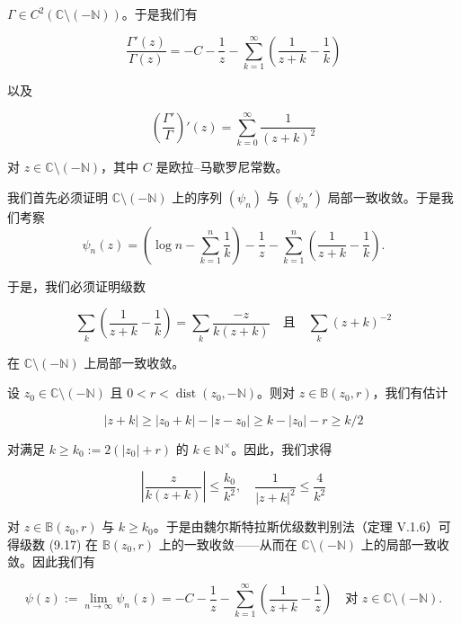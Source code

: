 \begin{proposition}

$ \Gamma \in C^{2}(\mathbb{C}\setminus(-\mathbb{N})) $。于是我们有

\begin{equation}
\frac{\Gamma'(z)}{\Gamma(z)} = -C - \frac{1}{z} - \sum_{k=1}^{\infty} \left( \frac{1}{z+k} - \frac{1}{k} \right)\tag{9.15}
\end{equation}

以及

\begin{equation}
\left( \frac{\Gamma'}{\Gamma} \right)'(z) = \sum_{k=0}^{\infty} \frac{1}{(z+k)^{2}}\tag{9.16}
\end{equation}

对 $ z \in \mathbb{C}\setminus(-\mathbb{N}) $，其中 $ C $ 是欧拉–马歇罗尼常数。

\proofhead
我们首先必须证明 $ \mathbb{C}\setminus(-\mathbb{N}) $ 上的序列 $ (\psi_n) $ 与 $ (\psi_n') $ 局部一致收敛。于是我们考察
\[
\psi_n(z) = \left( \log n - \sum_{k=1}^{n} \frac{1}{k} \right) - \frac{1}{z} - \sum_{k=1}^{n} \left( \frac{1}{z+k} - \frac{1}{k} \right) .
\]

于是，我们必须证明级数

\begin{equation}
\sum_{k} \left( \frac{1}{z+k} - \frac{1}{k} \right) = \sum_{k} \frac{-z}{k(z+k)} \quad \text{且} \quad \sum_{k} (z+k)^{-2}\tag{9.17}
\end{equation}

在 $ \mathbb{C}\setminus(-\mathbb{N}) $ 上局部一致收敛。

设 $ z_0 \in \mathbb{C}\setminus(-\mathbb{N}) $ 且 $ 0 < r < \operatorname{dist}(z_0, -\mathbb{N}) $。则对 $ z \in \mathbb{B}(z_0, r) $，我们有估计

\[
|z+k| \ge |z_0+k| - |z - z_0| \ge k - |z_0| - r \ge k/2
\]

对满足 $ k \ge k_0 := 2(|z_0| + r) $ 的 $ k \in \mathbb{N}^{\times} $。因此，我们求得

\[
\left| \frac{z}{k(z+k)} \right| \le \frac{k_0}{k^{2}} , \quad \frac{1}{|z+k|^{2}} \le \frac{4}{k^{2}}
\]

对 $ z \in \mathbb{B}(z_0, r) $ 与 $ k \ge k_0 $。于是由魏尔斯特拉斯优级数判别法（定理 V.1.6）可得级数 (9.17) 在 $ \mathbb{B}(z_0, r) $ 上的一致收敛——从而在 $ \mathbb{C}\setminus(-\mathbb{N}) $ 上的局部一致收敛。因此我们有

\begin{equation}
\psi(z) := \lim_{n \to \infty} \psi_n(z) = -C - \frac{1}{z} - \sum_{k=1}^{\infty} \left( \frac{1}{z+k} - \frac{1}{z} \right) \quad \text{对 } z \in \mathbb{C}\setminus(-\mathbb{N}) .\tag{9.18}
\end{equation}


\end{proposition}
